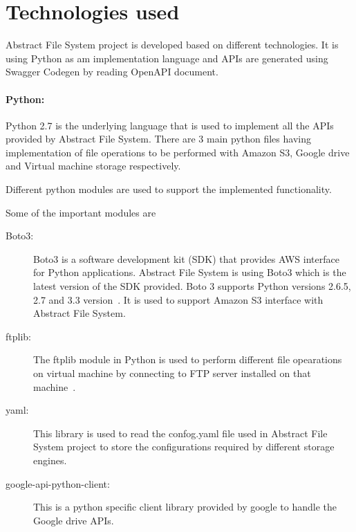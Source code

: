 \section{Technologies used}

Abstract File System project is developed based on different 
technologies. It is using Python as am implementation language 
and APIs are generated using Swagger Codegen by reading 
OpenAPI document.

\paragraph{Python:}

Python 2.7 is the underlying language that is used to implement all the APIs 
provided by Abstract File System.  There are 3 main python files having 
implementation of file operations to be performed with Amazon S3, Google drive 
and Virtual machine storage respectively. 


Different python modules are used to support the implemented functionality.

Some of the important modules are 

\begin{description}
\item[Boto3:] Boto3 is a software development kit (SDK) that provides AWS 
interface for 
Python applications. Abstract File System is using Boto3 which is the latest 
version of the SDK provided. Boto 3 supports Python versions 2.6.5, 2.7 and 
3.3 version~\cite{hid-sp18-420-boto}. 
It is used to support Amazon S3 interface with Abstract File System.

\item[ftplib:] The ftplib module in Python is used to perform different file 
opearations on 
virtual machine by connecting to FTP server installed on that 
machine~\cite{hid-sp18-420-FTP}.

\item[yaml:] This library is used to read the confog.yaml file used in Abstract 
File System 
project to store the configurations required by different storage engines.



\item[google-api-python-client:]

This is a python specific client library provided by google to handle the 
Google drive APIs.

\end{description}

